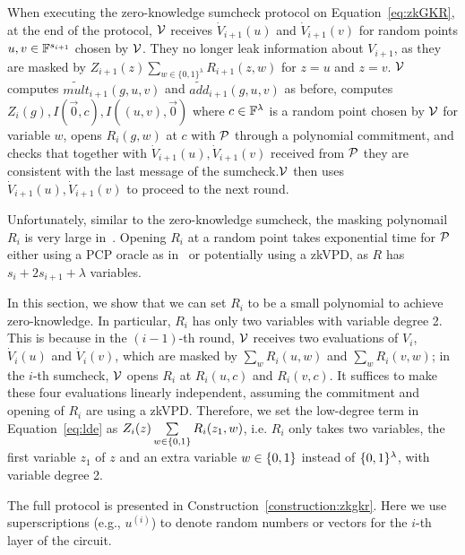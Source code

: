 When executing the zero-knowledge sumcheck protocol on Equation~\ref{eq:zkGKR}, at the end of the protocol, $\V$ receives $\dot{V}_{i+1}(u)$ and $\dot{V}_{i+1}(v)$ for random points $u,v\in\F^{s_{i+1}}$ chosen by $\V$. They no longer leak information about $V_{i+1}$, as they are masked by $Z_{i+1}(z)\sum\limits_{w \in \{0, 1\}^\lambda}R_{i+1}(z, w)$ for $z=u$ and $z=v$. $\V$ computes $\tilde{mult}_{i+1}(g,u,v)$ and $\tilde{add}_{i+1}(g,u,v)$ as before, computes $Z_i(g), I(\vec{0},c), I((u,v),\vec{0})$ where $c\in\F^\lambda$ is a random point chosen by $\V$ for variable $w$, opens $R_i(g,w)$ at $c$  with $\P$ through a polynomial commitment, and checks that together with $\dot{V}_{i+1}(u), \dot{V}_{i+1}(v)$ received from $\P$ they are consistent with the last message of the sumcheck.$\V$ then uses $\dot{V}_{i+1}(u), \dot{V}_{i+1}(v)$ to proceed to the next round.

Unfortunately, similar to the zero-knowledge sumcheck, the masking polynomail $R_i$ is very large in~\cite{zksumcheck}. Opening $R_i$ at a random point takes exponential time for $\P$ either using a PCP oracle as in~\cite{zksumcheck} or potentially using a zkVPD, as $R$ has $s_i+2s_{i+1}+\lambda$ variables.

In this section, we show that we can set $R_i$ to be a small polynomial to achieve zero-knowledge. In particular, $R_i$ has only two variables with variable degree 2. This is because in the $(i-1)$-th round, $\V$ receives two evaluations of $V_i$, $\dot{V}_i(u)$ and $\dot{V}_i(v)$,  which are masked by $\sum_{w}R_i(u,w)$ and $\sum_{w}R_i(v,w)$; in the $i$-th sumcheck, $\V$ opens $R_i$ at $R_i(u,c)$ and $R_i(v,c)$. It suffices to make these four evaluations linearly independent, assuming the commitment and opening of $R_i$ are using a zkVPD. Therefore, we set the low-degree term in Equation~\ref{eq:lde} as $Z_i(z)\sum\limits_{w \in\binary} R_i(z_1, w)$, i.e. $R_i$ only takes two variables, the first variable $z_1$ of $z$ and an extra variable $w\in\binary$ instead of $\binary^\lambda$, with variable degree 2. 

The full protocol is presented in Construction~\ref{construction:zkgkr}. Here we use superscriptions (e.g., $u^{(i)}$) to denote random numbers or vectors for the $i$-th layer of the circuit.


